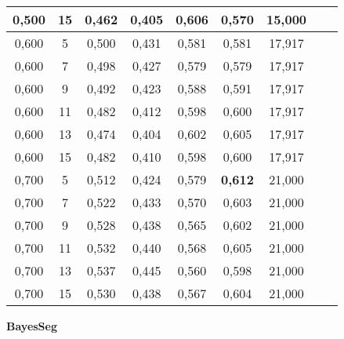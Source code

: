 \documentclass{article}
\begin{document}
\begin{longtable}[c]{|c|c|c|c|c|c|c|c|c|}
 0,500 & 15 & 0,462 & 0,405 & 0,606 & 0,570 & 15,000  \\ \hline 
 0,600 & 5 & 0,500 & 0,431 & 0,581 & 0,581 & 17,917  \\ \hline 
 0,600 & 7 & 0,498 & 0,427 & 0,579 & 0,579 & 17,917  \\ \hline 
 0,600 & 9 & 0,492 & 0,423 & 0,588 & 0,591 & 17,917  \\ \hline 
 0,600 & 11 & 0,482 & 0,412 & 0,598 & 0,600 & 17,917  \\ \hline 
 0,600 & 13 & 0,474 & 0,404 & 0,602 & 0,605 & 17,917  \\ \hline 
 0,600 & 15 & 0,482 & 0,410 & 0,598 & 0,600 & 17,917  \\ \hline 
 0,700 & 5 & 0,512 & 0,424 & 0,579 & \cellcolor{gray!20} \textbf{0,612} & 21,000  \\ \hline 
 0,700 & 7 & 0,522 & 0,433 & 0,570 & 0,603 & 21,000  \\ \hline 
 0,700 & 9 & 0,528 & 0,438 & 0,565 & 0,602 & 21,000  \\ \hline 
 0,700 & 11 & 0,532 & 0,440 & 0,568 & 0,605 & 21,000  \\ \hline 
 0,700 & 13 & 0,537 & 0,445 & 0,560 & 0,598 & 21,000  \\ \hline 
 0,700 & 15 & 0,530 & 0,438 & 0,567 & 0,604 & 21,000  \\ \hline 
 \end{longtable} 







 \newpage
{  
\large
\center
	\textbf{BayesSeg}  

}
\end{document}

